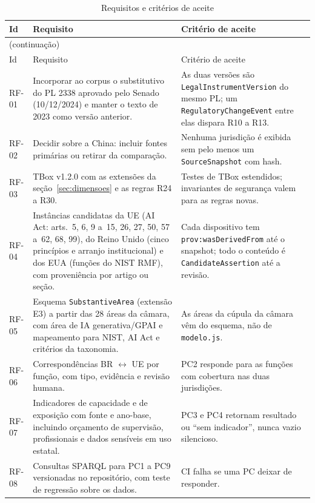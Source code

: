 \documentclass[12pt,a4paper,oneside,english,brazil]{abntex2}
\begin{document}
{\small
\begin{longtable}{l >{\raggedright\arraybackslash}p{76mm} >{\raggedright\arraybackslash}p{58mm}}
\caption{Requisitos e critérios de aceite}\label{tab:requisitos}\\
\toprule
Id & Requisito & Critério de aceite\\
\midrule\endfirsthead
\multicolumn{3}{l}{(continuação)}\\
\toprule
Id & Requisito & Critério de aceite\\
\midrule\endhead
\bottomrule\endlastfoot
RF-01 & Incorporar ao corpus o substitutivo do PL 2338 aprovado pelo Senado (10/12/2024) e manter o texto de 2023 como versão anterior. & As duas versões são \texttt{LegalInstrumentVersion} do mesmo PL; um \texttt{RegulatoryChangeEvent} entre elas dispara R10 a R13.\\
RF-02 & Decidir sobre a China: incluir fontes primárias ou retirar da comparação. & Nenhuma jurisdição é exibida sem pelo menos um \texttt{SourceSnapshot} com hash.\\
RF-03 & TBox v1.2.0 com as extensões da seção~\ref{sec:dimensoes} e as regras R24 a R30. & Testes de TBox estendidos; invariantes de segurança valem para as regras novas.\\
RF-04 & Instâncias candidatas da UE (AI Act: arts.~5, 6, 9 a~15, 26, 27, 50, 57 a~62, 68, 99), do Reino Unido (cinco princípios e arranjo institucional) e dos EUA (funções do NIST RMF), com proveniência por artigo ou seção. & Cada dispositivo tem \texttt{prov:wasDerivedFrom} \cite{w3c-provo} até o snapshot; todo o conteúdo é \texttt{CandidateAssertion} até a revisão.\\
RF-05 & Esquema \texttt{SubstantiveArea} (extensão E3) a partir das 28 áreas da câmara, com área de IA generativa/GPAI e mapeamento para NIST, AI Act e critérios da taxonomia. & As áreas da cúpula da câmara vêm do esquema, não de \texttt{modelo.js}.\\
RF-06 & Correspondências BR $\leftrightarrow$ UE por função, com tipo, evidência e revisão humana. & PC2 responde para as funções com cobertura nas duas jurisdições.\\
RF-07 & Indicadores de capacidade e de exposição com fonte e ano-base, incluindo orçamento de supervisão, profissionais e dados sensíveis em uso estatal. & PC3 e PC4 retornam resultado ou ``sem indicador'', nunca vazio silencioso.\\
RF-08 & Consultas SPARQL para PC1 a PC9 versionadas no repositório, com teste de regressão sobre os dados. & CI falha se uma PC deixar de responder.\\

\end{longtable}}
\end{document}
